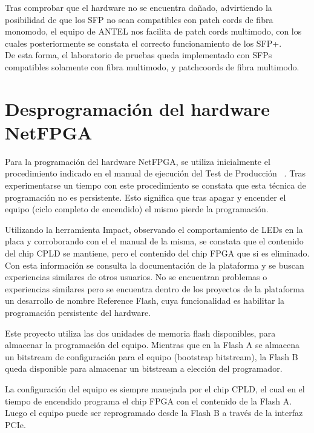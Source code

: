 Tras comprobar que el hardware no se encuentra dañado, advirtiendo la posibilidad de que los SFP no sean compatibles con patch cords de fibra monomodo, el equipo de ANTEL nos facilita de patch cords multimodo, con los cuales posteriormente se constata el correcto funcionamiento de los SFP+.\\

De esta forma, el laboratorio de pruebas queda implementado con SFPs compatibles solamente con fibra multimodo, y patchcoords de fibra multimodo.

\section{Desprogramaci\'on del hardware NetFPGA}
\label{apendiceB2}

Para la programación del hardware NetFPGA, se utiliza inicialmente el procedimiento indicado en el manual de ejecuci\'on del Test de Producci\'on ~\citep{ProdTestManual}. Tras experimentarse un tiempo con este procedimiento se constata que esta técnica de programación no es persistente. Esto significa que tras apagar y encender el equipo (ciclo completo de encendido) el mismo pierde la programación. 

Utilizando la herramienta Impact, observando el comportamiento de LEDs en la placa y corroborando con el el manual de la misma, se constata que el contenido del chip CPLD se mantiene, pero el contenido del chip FPGA que si es eliminado.\\

Con esta información se consulta la documentación de la plataforma y se buscan experiencias similares  de otros usuarios. No se encuentran problemas o experiencias similares pero se encuentra dentro de los proyectos de la plataforma un desarrollo de nombre Reference Flash, cuya funcionalidad es habilitar la programación persistente del hardware.

Este proyecto utiliza las dos unidades de memoria flash disponibles, para almacenar la programaci\'on del equipo. Mientras que en la Flash A se almacena un bitstream de configuración para el equipo 
 (bootstrap bitstream), la  Flash B queda disponible para almacenar un bitstream a elección del programador. 

La configuración del equipo es siempre manejada por el chip CPLD, el cual en el tiempo de encendido programa el chip FPGA con el contenido de la Flash A. Luego el equipo puede ser reprogramado desde la Flash B a través de la interfaz PCIe.

